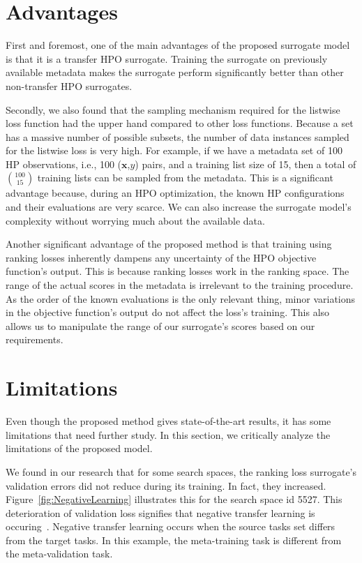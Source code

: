 \documentclass[12pt, twoside, ngerman]{report}
\begin{document}
\section{Advantages}
\label{sec:advantages}

First and foremost, one of the main advantages of the proposed surrogate model is that it is a transfer HPO surrogate. Training the surrogate on previously available metadata makes the surrogate perform significantly better than other non-transfer HPO surrogates.

Secondly, we also found that the sampling mechanism required for the listwise loss function had the upper hand compared to other loss functions. Because a set has a massive number of possible subsets, the number of data instances sampled for the listwise loss is very high. 
For example, if we have a metadata set of 100 HP observations, i.e., 100 ($\textbf{x}$,$y$) pairs, and a training list size of 15, then a total of ${100 \choose 15}$ training lists can be sampled from the metadata.
This is a significant advantage because, during an HPO optimization, the known HP configurations and their evaluations are very scarce.
We can also increase the surrogate model's complexity without worrying much about the available data.

Another significant advantage of the proposed method is that training using ranking losses inherently dampens any uncertainty of the HPO objective function's output.
This is because ranking losses work in the ranking space. The range of the actual scores in the metadata is irrelevant to the training procedure.
As the order of the known evaluations is the only relevant thing, minor variations in the objective function's output do not affect the loss's training. This also allows us to manipulate the range of our surrogate's scores based on our requirements.


\section{Limitations}
\label{sec:Limitations}
\label{sec:NegativeTransferLearning}
Even though the proposed method gives state-of-the-art results, it has some limitations that need further study. In this section, we critically analyze the limitations of the proposed model.

We found in our research that for some search spaces, the ranking loss surrogate's validation errors did not reduce during its training. In fact, they increased.
Figure~\ref{fig:NegativeLearning} illustrates this for the search space id 5527.
This deterioration of validation loss signifies that negative transfer learning is occuring~\cite{Weiss2016}.
Negative transfer learning occurs when the source tasks set differs from the target tasks. In this example, the meta-training task is different from the meta-validation task.
\end{document}
